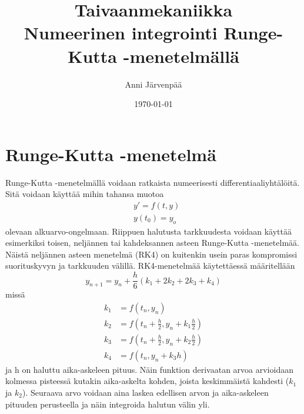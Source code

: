 \documentclass[12pt,a4paper,titlepage]{article}
\title{Taivaanmekaniikka \\ Numeerinen integrointi Runge-Kutta -menetelmällä \vspace{0.5em}}
\author{\begin{tabular}{c}
Anni Järvenpää
\end{tabular}}
\date{\today}
\begin{document}
\maketitle

\newpage
\null
\thispagestyle{empty}
\addtocounter{page}{-1}
\newpage

\section{Runge-Kutta -menetelmä} \label{menetelma}
Runge-Kutta -menetelmällä voidaan ratkaista numeerisesti differentiaaliyhtälöitä. Sitä voidaan käyttää mihin tahansa muotoa
\begin{align*}
	&y'=f(t,y) \\
	&y(t_0)=y_o
\end{align*}
olevaan alkuarvo-ongelmaan. Riippuen halutusta tarkkuudesta voidaan käyttää esimerkiksi toisen, neljännen tai kahdeksannen asteen Runge-Kutta -menetelmää. Näistä neljännen asteen menetelmä (RK4) on kuitenkin usein paras kompromissi suorituskyvyn ja tarkkuuden välillä. RK4-menetelmää käytettäessä määritellään
\begin{equation}
	y_{n+1} = y_n + \frac{h}{6}(k_1+2k_2+2k_3+k_4)
\end{equation}
missä
\begin{align*}
	k_1 &= f(t_n, y_n) \\
	k_2 &= f(t_n + \frac{h}{2}, y_n + k_1\frac{h}{2})\\
	k_3 &= f(t_n + \frac{h}{2}, y_n + k_2\frac{h}{2})\\
	k_4 &= f(t_n, y_n+k_3h)
\end{align*}
ja h on haluttu aika-askeleen pituus. Näin funktion derivaatan arvoa arvioidaan kolmessa pisteessä kutakin aika-askelta kohden, joista keskimmäistä kahdesti ($k_1$ ja $k_2$). Seuraava arvo voidaan aina laskea edellisen arvon ja aika-askeleen pituuden perusteella ja näin integroida halutun välin yli.~\cite{voesnek}
\end{document}

